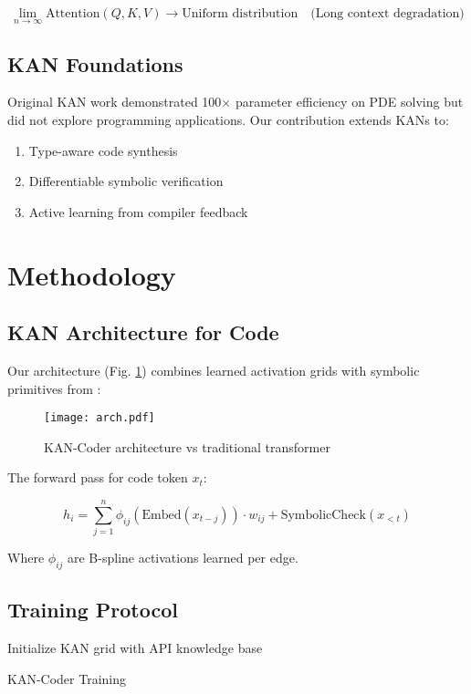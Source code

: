 \documentclass[12pt]{article}
\begin{document}
\begin{equation}
\lim_{n\to\infty} \text{Attention}(Q,K,V) \rightarrow \text{Uniform distribution} \quad\text{(Long context degradation)}
\end{equation}

\subsection{KAN Foundations}
Original KAN work \cite{kan} demonstrated 100$\times$ parameter efficiency on PDE solving but did not explore programming applications. Our contribution extends KANs to:

\begin{enumerate}
\item Type-aware code synthesis
\item Differentiable symbolic verification
\item Active learning from compiler feedback
\end{enumerate}

\section{Methodology}
\subsection{KAN Architecture for Code}
Our architecture (Fig. \ref{fig:arch}) combines learned activation grids with symbolic primitives from \cite{ai_theory}:

\begin{figure}[H]
\centering
\texttt{[image: arch.pdf]}
\caption{KAN-Coder architecture vs traditional transformer}
\label{fig:arch}
\end{figure}

The forward pass for code token $x_t$:

\begin{equation}
h_i = \sum_{j=1}^n \phi_{ij}(\text{Embed}(x_{t-j})) \cdot w_{ij} + \text{SymbolicCheck}(x_{<t})
\end{equation}

Where $\phi_{ij}$ are B-spline activations learned per edge.

\subsection{Training Protocol}
\begin{algorithm}[H]
\SetAlgoLined
Initialize KAN grid with API knowledge base\;
\caption{KAN-Coder Training}
\end{algorithm}
\end{document}
